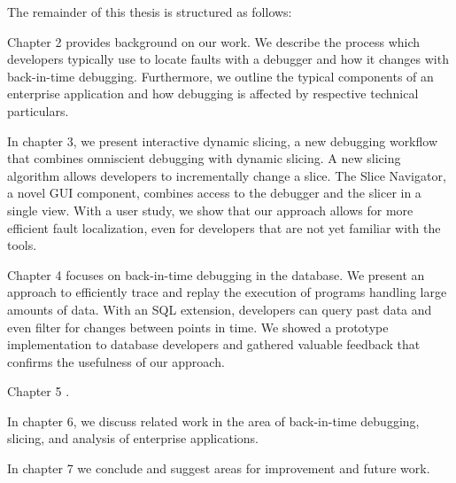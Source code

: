 The remainder of this thesis is structured as follows:

Chapter 2 provides background on our work.
We describe the process which developers typically use to locate faults with a debugger and how it changes with back-in-time debugging.
Furthermore, we outline the typical components of an enterprise application and how debugging is affected by respective technical particulars.

In chapter 3, we present interactive dynamic slicing, a new debugging workflow that combines omniscient debugging with dynamic slicing.
A new slicing algorithm allows developers to incrementally change a slice. 
The Slice Navigator, a novel GUI component, combines access to the debugger and the slicer in a single view.
With a user study, we show that our approach allows for more efficient fault localization, even for developers that are not yet familiar with the tools.

Chapter 4 focuses on back-in-time debugging in the database.
We present an approach to efficiently trace and replay the execution of programs handling large amounts of data.
With an SQL extension, developers can query past data and even filter for changes between points in time.
We showed a prototype implementation to database developers and gathered valuable feedback that confirms the usefulness of our approach.

Chapter 5 .

In chapter 6, we discuss related work in the area of back-in-time debugging, slicing, and analysis of enterprise applications.

In chapter 7 we conclude and suggest areas for improvement and future work.


%
%



